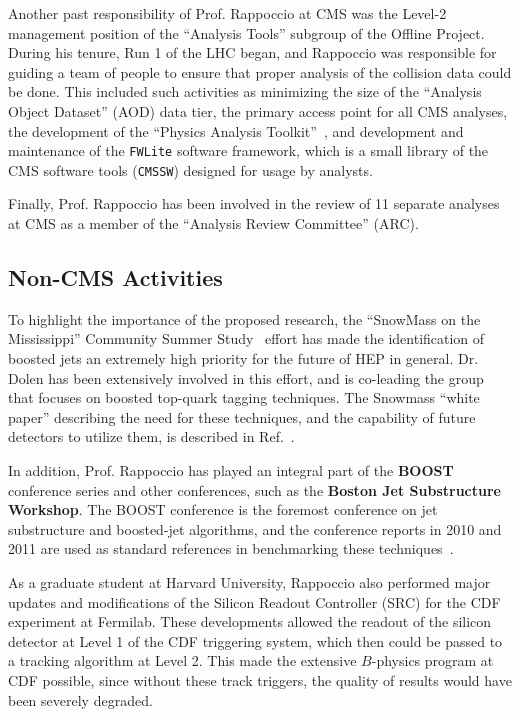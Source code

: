 \documentclass[12pt]{proposalnsf}
\begin{document}
Another past responsibility of Prof. Rappoccio at CMS was the Level-2
management position of the ``Analysis Tools'' subgroup of
the Offline Project. During his tenure, Run 1 of the LHC began, and
Rappoccio was responsible for guiding a team of people to ensure that
proper analysis of the collision data could be done. This included
such activities as minimizing the size of the ``Analysis Object
Dataset'' (AOD) data tier, the primary access point for all CMS
analyses, the development of the ``Physics Analysis
Toolkit''~\cite{pat}, and development and maintenance of the 
{\tt FWLite} software
framework, which is a small library of the CMS software tools 
({\tt CMSSW}) designed for usage by analysts. 

Finally, Prof. Rappoccio has been involved in the review of 11
separate analyses at CMS as a member of the ``Analysis Review
Committee'' (ARC). 

\subsection{Non-CMS Activities}
To highlight the importance of the proposed research, the ``SnowMass
on the Mississippi'' Community Summer Study~\cite{snowmass} effort
has made the identification of boosted jets an
extremely high priority for the future of HEP in general. Dr. Dolen
has been extensively involved in this effort, and is co-leading the
group that focuses on boosted top-quark tagging techniques. The
Snowmass ``white paper'' describing the need for these techniques, and
the capability of future detectors to utilize them, is described in
Ref.~\cite{snowmass_topdet}. 

In addition, Prof. Rappoccio has played an integral part of the {\bf BOOST}
conference series and other conferences, such as the {\bf Boston Jet
  Substructure Workshop}. The BOOST conference is the foremost
conference on jet substructure and boosted-jet algorithms, and the
conference reports in 2010 and 2011 are used as standard references in
benchmarking these techniques~\cite{boost2010,boost2011}.


As a graduate student at Harvard University, Rappoccio also performed
major updates and modifications of the Silicon Readout Controller
(SRC) for the CDF experiment at Fermilab. These developments allowed
the readout of the silicon detector at Level 1 of the CDF triggering
system, which then could be passed to a tracking algorithm at Level
2. This made the extensive $B$-physics program at CDF possible, since
without these track triggers, the quality of results would have been
severely degraded. 
\end{document}

